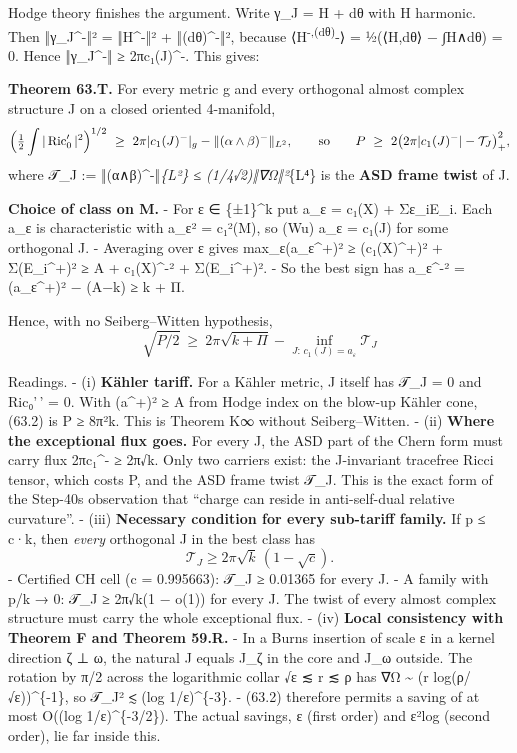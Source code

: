 \documentclass[
  10pt,
]{report}
\begin{document}
Hodge theory finishes the argument. Write γ\_J = H + dθ with H harmonic.
Then ‖γ\_J\^{}-‖² = ‖H\^{}-‖² + ‖(dθ)\^{}-‖², because
⟨H\textsuperscript{-,(dθ)}-⟩ = ½(⟨H,dθ⟩ − ∫H∧dθ) = 0. Hence ‖γ\_J\^{}-‖
≥ 2π\textbar c₁(J)\^{}-\textbar. This gives:

\textbf{Theorem 63.T.} For every metric g and every orthogonal almost
complex structure J on a closed oriented 4-manifold, \[
\Bigl(\tfrac12\int|\operatorname{Ric}_0'|^2\Bigr)^{1/2}\ \ge\ 2\pi|c_1(J)^-|_g-\|(\alpha\wedge\beta)^-\|_{L^2},
\qquad\text{so}\qquad
P\ \ge\ 2\bigl(2\pi|c_1(J)^-|-\mathcal T_J\bigr)_+^2 ,
\] where 𝒯\_J := ‖(α∧β)\^{}-‖\emph{\{L²\} ≤ (1/4√2)‖∇Ω‖²}\{L⁴\} is the
\textbf{ASD frame twist} of J.

\textbf{Choice of class on M.} - For ε ∈ \{±1\}\^{}k put a\_ε = c₁(X) +
Σε\_iE\_i. Each a\_ε is characteristic with a\_ε² = c₁²(M), so (Wu) a\_ε
= c₁(J) for some orthogonal J. - Averaging over ε gives
max\_ε(a\_ε\^{}+)² ≥ (c₁(X)\^{}+)² + Σ(E\_i\^{}+)² ≥ A +
\textbar c₁(X)\^{}-\textbar² + Σ(E\_i\^{}+)². - So the best sign has
\textbar a\_ε\^{}-\textbar² = (a\_ε\^{}+)² − (A−k) ≥ k + Π.

Hence, with no Seiberg--Witten hypothesis, \[
\boxed{\ \sqrt{P/2}\ \ge\ 2\pi\sqrt{k+\Pi}-\inf_{J:\,c_1(J)=a_\varepsilon}\mathcal T_J\ }
\tag{63.2}
\]

Readings. - (i) \textbf{Kähler tariff.} For a Kähler metric, J itself
has 𝒯\_J = 0 and Ric₀'\,' = 0. With (a\^{}+)² ≥ A from Hodge index on
the blow-up Kähler cone, (63.2) is P ≥ 8π²k. This is Theorem K∞ without
Seiberg--Witten. - (ii) \textbf{Where the exceptional flux goes.} For
every J, the ASD part of the Chern form must carry flux
2π\textbar c₁\^{}-\textbar{} ≥ 2π√k. Only two carriers exist: the
J-invariant tracefree Ricci tensor, which costs P, and the ASD frame
twist 𝒯\_J. This is the exact form of the Step-40s observation that
``charge can reside in anti-self-dual relative curvature''. - (iii)
\textbf{Necessary condition for every sub-tariff family.} If p ≤ c·k,
then \emph{every} orthogonal J in the best class has \[
  \mathcal T_J\ge 2\pi\sqrt k\,(1-\sqrt c).
  \] - Certified CH cell (c = 0.995663): 𝒯\_J ≥ 0.01365 for every J. - A
family with p/k → 0: 𝒯\_J ≥ 2π√k(1 − o(1)) for every J. The twist of
every almost complex structure must carry the whole exceptional flux. -
(iv) \textbf{Local consistency with Theorem F and Theorem 59.R.} - In a
Burns insertion of scale ε in a kernel direction ζ ⊥ ω, the natural J
equals J\_ζ in the core and J\_ω outside. The rotation by π/2 across the
logarithmic collar √ε ≲ r ≲ ρ has \textbar∇Ω\textbar{} \textasciitilde{}
(r log(ρ/√ε))\^{}\{-1\}, so 𝒯\_J² ≲ (log 1/ε)\^{}\{-3\}. - (63.2)
therefore permits a saving of at most O((log 1/ε)\^{}\{-3/2\}). The
actual savings, ε (first order) and ε²log (second order), lie far inside
this.
\end{document}
